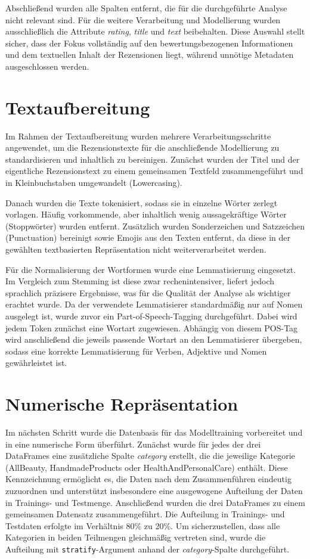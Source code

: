 Abschließend wurden alle Spalten entfernt, die für die durchgeführte Analyse
nicht relevant sind. Für die weitere Verarbeitung und Modellierung wurden
ausschließlich die Attribute \textit{rating}, \textit{title} und \textit{text}
beibehalten. Diese Auswahl stellt sicher, dass der Fokus vollständig auf den
bewertungsbezogenen Informationen und dem textuellen Inhalt der Rezensionen
liegt, während unnötige Metadaten ausgeschlossen werden.

\section{Textaufbereitung}
Im Rahmen der Textaufbereitung wurden mehrere Verarbeitungsschritte angewendet, um 
die Rezensionstexte für die anschließende Modellierung zu standardisieren und 
inhaltlich zu bereinigen. Zunächst wurden der Titel und der eigentliche 
Rezensionstext zu einem gemeinsamen Textfeld zusammengeführt und in 
Kleinbuchstaben umgewandelt (Lowercasing). 

Danach wurden die Texte tokenisiert, sodass sie in einzelne Wörter zerlegt vorlagen.
Häufig vorkommende, aber inhaltlich wenig aussagekräftige Wörter (Stoppwörter) wurden 
entfernt. Zusätzlich wurden Sonderzeichen und Satzzeichen (Punctuation) bereinigt 
sowie Emojis aus den Texten entfernt, da diese in der gewählten textbasierten 
Repräsentation nicht weiterverarbeitet werden.

Für die Normalisierung der Wortformen wurde eine Lemmatisierung eingesetzt. Im 
Vergleich zum Stemming ist diese zwar rechenintensiver, liefert jedoch sprachlich 
präzisere Ergebnisse, was für die Qualität der Analyse als wichtiger erachtet wurde. 
Da der verwendete Lemmatisierer standardmäßig nur auf Nomen ausgelegt ist, wurde 
zuvor ein Part-of-Speech-Tagging durchgeführt. Dabei wird jedem Token 
zunächst eine Wortart zugewiesen. Abhängig von diesem POS-Tag wird anschließend die 
jeweils passende Wortart an den Lemmatisierer übergeben, sodass eine korrekte 
Lemmatisierung für Verben, Adjektive und Nomen gewährleistet ist.

\section{Numerische Repräsentation}
Im nächsten Schritt wurde die Datenbasis für das Modelltraining vorbereitet und in 
eine numerische Form überführt. Zunächst wurde für jedes der drei DataFrames eine 
zusätzliche Spalte \textit{category} erstellt, die die jeweilige Kategorie 
(AllBeauty, HandmadeProducts oder HealthAndPersonalCare) enthält. Diese 
Kennzeichnung ermöglicht es, die Daten nach dem Zusammenführen eindeutig zuzuordnen 
und unterstützt insbesondere eine ausgewogene Aufteilung der Daten in Trainings- und 
Testmenge.
Anschließend wurden die drei DataFrames zu einem gemeinsamen Datensatz zusammengeführt. 
Die Aufteilung in Trainings- und Testdaten erfolgte im Verhältnis 80\% zu 20\%. Um 
sicherzustellen, dass alle Kategorien in beiden Teilmengen gleichmäßig vertreten sind, 
wurde die Aufteilung mit \texttt{stratify}-Argument anhand der 
\textit{category}-Spalte durchgeführt.

